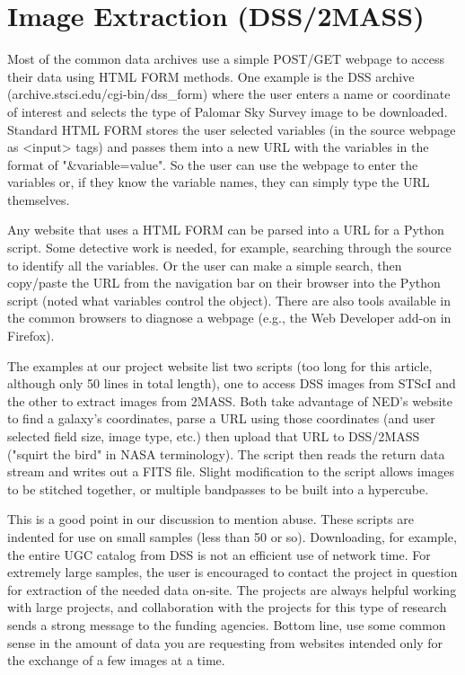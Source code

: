 \documentclass[11pt,preprint,graphicx]{aastex}
\begin{document}
\section{Image Extraction (DSS/2MASS)}

\noindent Most of the common data archives use a simple POST/GET webpage to
access their data using HTML FORM methods.  One example is the DSS archive
(archive.stsci.edu/cgi-bin/dss\_form) where the user enters a name or
coordinate of interest and selects the type of Palomar Sky Survey image to
be downloaded.  Standard HTML FORM stores the user selected variables (in
the source webpage as <input> tags) and passes them into a new URL with the
variables in the format of "\&variable=value".  So the user can use the
webpage to enter the variables or, if they know the variable names, they
can simply type the URL themselves.

\noindent Any website that uses a HTML FORM can be parsed into a URL for a
Python script.  Some detective work is needed, for example, searching
through the source to identify all the variables.  Or the user can make a
simple search, then copy/paste the URL from the navigation bar on their
browser into the Python script (noted what variables control the object).
There are also tools available in the common browsers to diagnose a webpage
(e.g., the Web Developer add-on in Firefox).

\noindent The examples at our project website list two scripts (too long
for this article, although only 50 lines in total length), one to access
DSS images from STScI and the other to extract images from 2MASS.  Both
take advantage of NED's website to find a galaxy's coordinates, parse a URL
using those coordinates (and user selected field size, image type, etc.)
then upload that URL to DSS/2MASS ("squirt the bird" in NASA terminology).
The script then reads the return data stream and writes out a FITS file.
Slight modification to the script allows images to be stitched together, or
multiple bandpasses to be built into a hypercube.

\noindent This is a good point in our discussion to mention abuse.  These
scripts are indented for use on small samples (less than 50 or so).
Downloading, for example, the entire UGC catalog from DSS is not an
efficient use of network time.  For extremely large samples, the user is
encouraged to contact the project in question for extraction of the needed
data on-site.  The projects are always helpful working with large projects,
and collaboration with the projects for this type of research sends a
strong message to the funding agencies.  Bottom line, use some common sense
in the amount of data you are requesting from websites intended only for
the exchange of a few images at a time.
\end{document}
